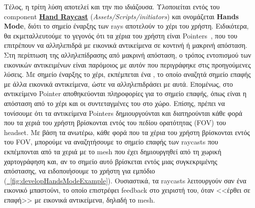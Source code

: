 Τέλος, η τρίτη λύση αποτελεί και την πιο ιδιάζουσα. Υλοποιείται εντός του component \hyperref[lst:handRaycast]{\textbf{Hand Raycast}} (\textit{Assets/Scripts/initiators}) και ονομάζεται \textbf{Hands Mode}, διότι το σημείο έναρξης των rays αποτελούν το χέρι του χρήστη. Ειδικότερα, θα εκμεταλλευτούμε το γεγονός ότι τα χέρια του χρήστη είναι Pointers~\cite{keveleigh_2022_pointers}, που του επιτρέπουν να αλληλεπιδρά με εικονικά αντικείμενα σε κοντινή ή μακρινή απόσταση. Στη περίπτωση της αλληλεπίδρασης από μακρινή απόσταση, ο τρόπος εντοπισμού των εικονικών αντικειμένων είναι παρόμοιος με αυτόν που περιγράφηκε στις προηγούμενες λύσεις. Με σημείο έναρξης το χέρι, εκπέμπεται ένα , το οποίο αναζητά σημείο επαφής με άλλα εικονικά αντικείμενα, ώστε να αλληλεπιδράσει με αυτά. Επομένως, στο αντικείμενο Pointer αποθηκεύονται πληροφορίες για το σημείο επαφής, όπως είναι η απόσταση από το χέρι και οι συντεταγμένες του στο χώρο. Επίσης, πρέπει να τονίσουμε ότι τα αντικείμενα Pointers δημιουργούνται και διατηρούνται κάθε φορά που τα χεριά του χρήστη βρίσκονται εντός του πεδίου ορατότητας (FOV) του headset. Με βάση τα ανωτέρω, κάθε φορά που τα χέρια του χρήστη βρίσκονται εντός του FOV, μπορούμε να αναζητήσουμε το σημείο επαφής των raycasts που εκπέμπονται από τα χεριά με το mesh που έχει δημιουργηθεί από τη χωρική χαρτογράφηση και, αν το σημείο αυτό βρίσκεται εντός μιας συγκεκριμένης απόστασης, να ειδοποιήσουμε το χρήστη για εμπόδιο (\hyperref[fig:developHandsModeExample]{\schema~\ref*{fig:developHandsModeExample}}).
Ουσιαστικά, τα raycasts λειτουργούν σαν ένα εικονικό μπαστούνι, το οποίο επιστρέφει feedback στο χειριστή του, όταν <<έρθει σε επαφή>> με εικονικά αντικείμενα, δηλαδή το mesh.

